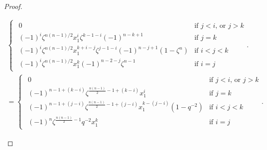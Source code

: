 \begin{proof}
\begin{enumerate}
\begin{align}
\begin{cases}
         \begin{array}{cl}
           0   & \text{if $j<i$, or $j>k$} \\
           (-1)^i\zeta^{n(n-1)/2}x_1^{i}\zeta^{k-1-i}(-1)^{n-k+1}    & \text{if $j=k$}\\
           (-1)^i\zeta^{n(n-1)/2}x_1^{k+i-j}\zeta^{j-1-i}(-1)^{n-j+1}(1-\zeta^{n})    &\text{if $i<j<k$}\\
           (-1)^i\zeta^{n(n-1)/2}x_1^{k}(-1)^{n-2-j}\zeta^{n-1}    &\text{if $i=j$}
         \end{array}.
     \end{cases}\\
     =\begin{cases}
         \begin{array}{cl}
           0   & \text{if $j<i$, or $j>k$} \\
           (-1)^{n-1+(k-i)}\zeta^{\frac{n(n-1)}{2}-1+(k-i)}x_1^{i}   & \text{if $j=k$}\\
           (-1)^{n-1+(j-i)}\zeta^{\frac{n(n-1)}{2}-1+(j-i)}x_1^{k-(j-i)}(1-q^{-2})    &\text{if $i<j<k$}\\
           (-1)^{n}\zeta^{\frac{n(n-1)}{2}-1}q^{-2}x_1^k    &\text{if $i=j$}
         \end{array}.\label{eq 3.5 lemma square flop 1 tensor x1k}
     \end{cases}
    \end{align}  
    \end{enumerate}


\end{proof}
